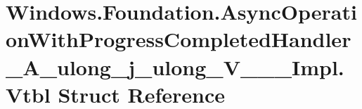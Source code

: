 \hypertarget{struct_windows_1_1_foundation_1_1_async_operation_with_progress_completed_handler___a__ulong__j__ulong___v_______impl_1_1_vtbl}{}\section{Windows.\+Foundation.\+Async\+Operation\+With\+Progress\+Completed\+Handler\+\_\+\+A\+\_\+ulong\+\_\+j\+\_\+ulong\+\_\+\+V\+\_\+\+\_\+\+\_\+\+Impl.\+Vtbl Struct Reference}
\label{struct_windows_1_1_foundation_1_1_async_operation_with_progress_completed_handler___a__ulong__j__ulong___v_______impl_1_1_vtbl}
